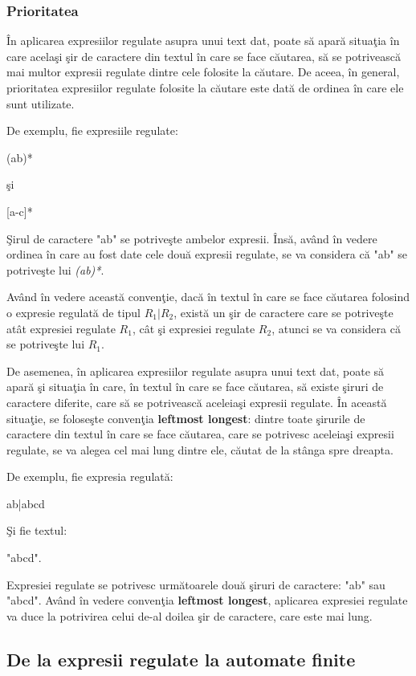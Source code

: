 \subsubsection{Prioritatea}

În aplicarea expresiilor regulate asupra unui text dat, poate să apară situaţia în care acelaşi şir de caractere din textul în care se face căutarea, să se potrivească mai multor expresii regulate dintre cele folosite la căutare. De aceea, în general, prioritatea expresiilor regulate folosite la căutare este dată de ordinea în care ele sunt utilizate. 

De exemplu, fie expresiile regulate: 

{\hfil (ab)* }

şi 

{\hfil [a-c]*}

Şirul de caractere "ab" se potriveşte ambelor expresii. Însă, având în vedere ordinea în care au fost date cele două expresii regulate, se va considera că "ab" se potriveşte lui \textit{(ab)*}.

Având în vedere această convenţie, dacă în textul în care se face căutarea folosind o expresie regulată de tipul $R_1|R_2$, există un şir de caractere care se potriveşte atât expresiei regulate $ R_1 $, cât şi expresiei regulate $ R_2 $, atunci se va considera că se potriveşte lui $R_1$.

De asemenea, în aplicarea expresiilor regulate asupra unui text dat, poate să apară şi situaţia în care, în textul în care se face căutarea, să existe şiruri de caractere diferite, care să se potrivească aceleiaşi expresii regulate. În această situaţie, se foloseşte convenţia \textbf {leftmost longest}: dintre toate şirurile de caractere din textul în care se face căutarea, care se potrivesc aceleiaşi expresii regulate, se va alegea cel mai lung dintre ele, căutat de la stânga spre dreapta.

De exemplu, fie expresia regulată:

{\hfil ab|abcd}

Şi fie textul:

"abcd". 

Expresiei regulate se potrivesc următoarele două şiruri de caractere: "ab" sau "abcd". Având în vedere convenţia \textbf {leftmost longest}, aplicarea expresiei regulate va duce la potrivirea celui de-al doilea şir de caractere, care este mai lung.

\subsection{De la expresii regulate la automate finite}

